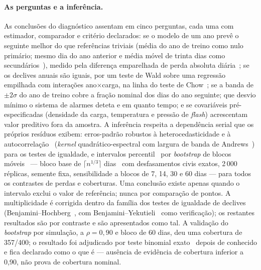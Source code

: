 \paragraph{As perguntas e a inferência.} As conclusões do diagnóstico
assentam em cinco perguntas, cada uma com estimador, comparador e
critério declarados: se o modelo de um ano prevê o seguinte melhor do que
referências triviais (média do ano de treino como nulo primário; mesmo dia
do ano anterior e média móvel de trinta dias como secundários~\cite{HyndmanKoehler2006}), medido
pela diferença emparelhada de perda absoluta diária~\cite{DieboldMariano1995,HarveyLeybourneNewbold1997}; se os declives anuais
são iguais, por um teste de Wald sobre uma regressão empilhada com
interações ano$\times$carga, na linha do teste de Chow~\cite{Chow1960}; se a banda de $\pm2\sigma$ do ano de treino
cobre a fração nominal dos dias do ano seguinte; que desvio mínimo o
sistema de alarmes deteta e em quanto tempo; e se covariáveis
pré-especificadas (densidade da carga, temperatura e pressão de
\emph{flash}) acrescentam valor preditivo fora da amostra. A inferência
respeita a dependência serial que os próprios resíduos exibem: erros-padrão
robustos à heterocedasticidade e à autocorrelação~\cite{NeweyWest1987}
(\emph{kernel} quadrático-espectral com largura de banda de
Andrews~\cite{Andrews1991}) para os testes de igualdade, e intervalos percentil~\cite{Efron1979,EfronTibshirani1993} por
\emph{bootstrap} de blocos móveis~\cite{Kunsch1989,Lahiri2003} --- bloco
base de $\lceil n^{1/3}\rceil$ dias~\cite{HallHorowitzJing1995} com
desfasamentos civis exatos, 2\,000 réplicas, semente fixa, sensibilidade a blocos de 7, 14,
30 e 60 dias --- para todos os contrastes de perdas e coberturas. Uma
conclusão existe apenas quando o intervalo exclui o valor de referência;
nunca por comparação de pontos. A multiplicidade é corrigida dentro da
família dos testes de igualdade de declives (Benjamini--Hochberg~\cite{BenjaminiHochberg1995}, com
Benjamini--Yekutieli~\cite{BenjaminiYekutieli2001} como verificação); os restantes resultados são por
contraste e são apresentados como tal. A validação do \emph{bootstrap} por
simulação, a $\rho = 0{,}90$ e bloco de 60 dias, deu uma cobertura de
357/400; o resultado foi adjudicado por teste binomial exato~\cite{ClopperPearson1934}
depois de conhecido e fica declarado como o que é --- ausência de evidência de
cobertura inferior a 0,90, não prova de cobertura nominal.

